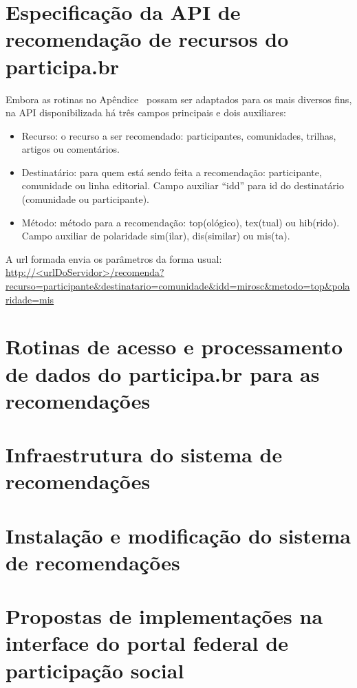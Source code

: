 \documentclass[12pt]{article}
\begin{document}
\section{Especificação da API de recomendação de recursos do participa.br}\label{sec:api}
Embora as rotinas no Apêndice~\cite{sec:algs} possam ser adaptados para os mais diversos fins, na API disponibilizada há três campos principais e dois auxiliares:
\begin{itemize}
    \item Recurso: o recurso a ser recomendado: participantes, comunidades, trilhas, artigos ou comentários.
    \item Destinatário: para quem está sendo feita a recomendação: participante, comunidade ou linha editorial. Campo auxiliar ``idd'' para id do destinatário (comunidade ou participante).
    \item Método: método para a recomendação: top(ológico), tex(tual) ou hib(rido). Campo auxiliar de polaridade sim(ilar), dis(similar) ou mis(ta).
\end{itemize} 
A url formada envia os parâmetros da forma usual:
\url{http://<urlDoServidor>/recomenda?recurso=participante&destinatario=comunidade&idd=mirosc&metodo=top&polaridade=mis}
\section{Rotinas de acesso e processamento de dados do participa.br para as recomendações}\label{sec:algs}
\section{Infraestrutura do sistema de recomendações}
\section{Instalação e modificação do sistema de recomendações}
\section{Propostas de implementações na interface do portal federal de participação social}\label{sec:acr}
\end{document}
